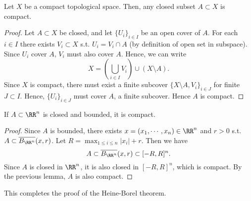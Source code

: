 \begin{lemma}
  Let $X$ be a compact topological space. Then, any closed subset $A\subset X$
  is compact.
  \label{<+label+>}
\end{lemma}
\begin{proof}
  Let $A\subset X$ be closed, and let $\{U_i\}_{i\in I}$ be an open cover of
  $A$. For each $i\in I$ there exists $V_i\subset X$ s.t. $U_i=V_i\cap A$ (by
  definition of open set in subspace). Since $U_i$ cover $A$, $V_i$ must also
  cover $A$. Hence, we can write
  \[X=(\bigcup_{i\in I} V_i)\cup (X\setminus A).\]
  Since $X$ is compact, there must exist a finite subcover $\{X\setminus A,
  V_i\}_{i\in J}$ for finite $J\subset I$. Hence, $\{U_i\}_{i\in J}$ must cover
  $A$, a finite subcover. Hence $A$ is compact.
\end{proof}

\begin{corollary}
  If $A\subset\RR^n$ is closed and bounded, it is compact.
  \label{<+label+>}
\end{corollary}
\begin{proof}
  Since $A$ is bounded, there exists $x=(x_1,\cdots, x_n)\in\RR^n$ and $r>0$
  s.t. $A\subset \overline{B_{\RR^n}}(x,r)$. Let $R=\max_{1\leq i\leq n}
  |x_i|+r$. Then we have
  \[A\subset \overline{B_{\RR^n}}(x,r)\subset [-R,R]^n.\]
  Since $A$ is closed in $\RR^n$, it is also closed in $[-R,R]^n$, which is
  compact. By the previous lemma, $A$ is also compact.
\end{proof}
This completes the proof of the Heine-Borel theorem.
